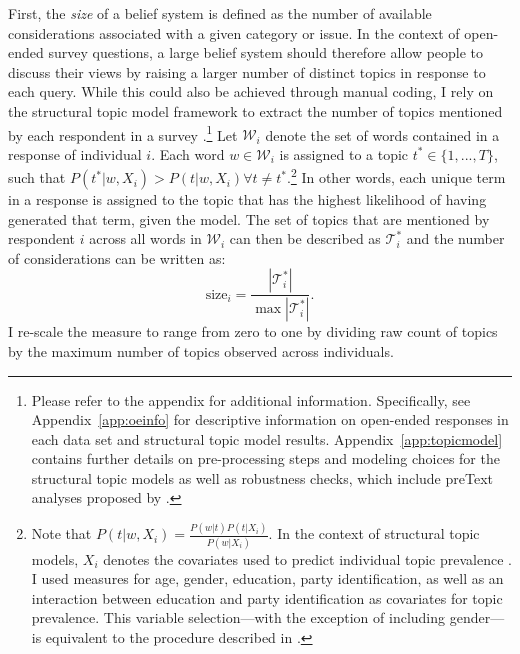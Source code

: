 First, the \textit{size} of a belief system is defined as the number of available considerations associated with a given category or issue. In the context of open-ended survey questions, a large belief system should therefore allow people to discuss their views by raising a larger number of distinct topics in response to each query. While this could also be achieved through manual coding, I rely on the structural topic model framework to extract the number of topics mentioned by each respondent in a survey \citep{roberts2014structural}.\footnote{Please refer to the appendix for additional information. Specifically, see Appendix~\ref{app:oeinfo} for descriptive information on open-ended responses in each data set and structural topic model results. Appendix~\ref{app:topicmodel} contains further details on pre-processing steps and modeling choices for the structural topic models as well as robustness checks, which include preText analyses proposed by \citet{denny2018text}.} Let $\mathcal{W}_i$ denote the set of words contained in a response of individual $i$. Each word $w\in\mathcal{W}_i$ is assigned to a topic $t^* \in \{1,...,T\} $, such that $P(t^*|w,X_i) > P(t|w,X_i) \forall t\neq t^*$.\footnote{Note that $P(t|w,X_i)=\tfrac{P(w|t)P(t|X_i)}{P(w|X_i)}$. In the context of structural topic models, $X_i$ denotes the covariates used to predict individual topic prevalence \citep[see][for details]{roberts2014structural}. I used measures for age, gender, education, party identification, as well as an interaction between education and party identification as covariates for topic prevalence. This variable selection---with the exception of including gender---is equivalent to the procedure described in \citet{roberts2014structural}.} In other words, each unique term in a response is assigned to the topic that has the highest likelihood of having generated that term, given the model. The set of topics that are mentioned by respondent $i$ across all words in $\mathcal{W}_i$ can then be described as $\mathcal{T}^*_i$ and the number of considerations can be written as:
\begin{equation}
\text{size}_i = \dfrac{|\mathcal{T}^*_i|}{\max|\mathcal{T}^*_i|}.
\end{equation}
I re-scale the measure to range from zero to one by dividing raw count of topics by the maximum number of topics observed across individuals.

